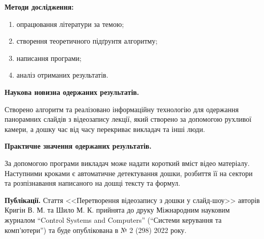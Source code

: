 \textbf{Методи дослідження:}
\begin{enumerate}
      \item опрацювання літератури за темою;
      \item створення теоретичного підґрунтя алгоритму;
      \item написання програми;
      \item аналіз отриманих результатів.
\end{enumerate}

\textbf{Наукова новизна одержаних результатів.}

Створено алгоритм та реалізовано інформаційну технологію
для одержання панорамних слайдів з відеозапису лекції,
який створено за допомогою рухливої камери,
а дошку час від часу перекриває викладач та інші люди.

\textbf{Практичне значення одержаних результатів.}

За допомогою програми викладач може надати короткий вміст
відео матеріалу. Наступними кроками є автоматичне детектування
дошки, розбиття її на сектори та розпізнавання написаного на
дошці тексту та формул.

\textbf{Публікації.}
Стаття <<Перетворення відеозапису з дошки у слайд-шоу>> авторів
Кригін В. М. та Шило М. К. прийнята до друку
Міжнародним науковим журналом “Control Systems and Computers”
(“Системи керування та комп'ютери”) та буде опублікована в № 2 (298) 2022 року.
